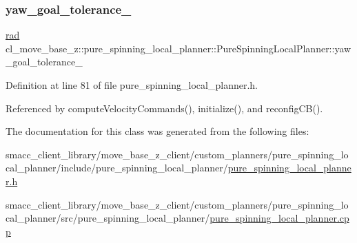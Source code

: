 \mbox{\label{classcl__move__base__z_1_1pure__spinning__local__planner_1_1PureSpinningLocalPlanner_a07334cd7bf29f391c2553f0038fa94e8}} 
\subsubsection{\texorpdfstring{yaw\+\_\+goal\+\_\+tolerance\+\_\+}{yaw\_goal\_tolerance\_}}
{\footnotesize\ttfamily \hyperlink{backward__local__planner_8h_a640effbe91ae9b25d698a883a9e80d96}{rad} cl\+\_\+move\+\_\+base\+\_\+z\+::pure\+\_\+spinning\+\_\+local\+\_\+planner\+::\+Pure\+Spinning\+Local\+Planner\+::yaw\+\_\+goal\+\_\+tolerance\+\_\+\hspace{0.3cm}{\ttfamily [private]}}



Definition at line 81 of file pure\+\_\+spinning\+\_\+local\+\_\+planner.\+h.



Referenced by compute\+Velocity\+Commands(), initialize(), and reconfig\+C\+B().



The documentation for this class was generated from the following files\+:\begin{DoxyCompactItemize}
\item 
smacc\+\_\+client\+\_\+library/move\+\_\+base\+\_\+z\+\_\+client/custom\+\_\+planners/pure\+\_\+spinning\+\_\+local\+\_\+planner/include/pure\+\_\+spinning\+\_\+local\+\_\+planner/\hyperlink{pure__spinning__local__planner_8h}{pure\+\_\+spinning\+\_\+local\+\_\+planner.\+h}\item 
smacc\+\_\+client\+\_\+library/move\+\_\+base\+\_\+z\+\_\+client/custom\+\_\+planners/pure\+\_\+spinning\+\_\+local\+\_\+planner/src/pure\+\_\+spinning\+\_\+local\+\_\+planner/\hyperlink{pure__spinning__local__planner_8cpp}{pure\+\_\+spinning\+\_\+local\+\_\+planner.\+cpp}\end{DoxyCompactItemize}

